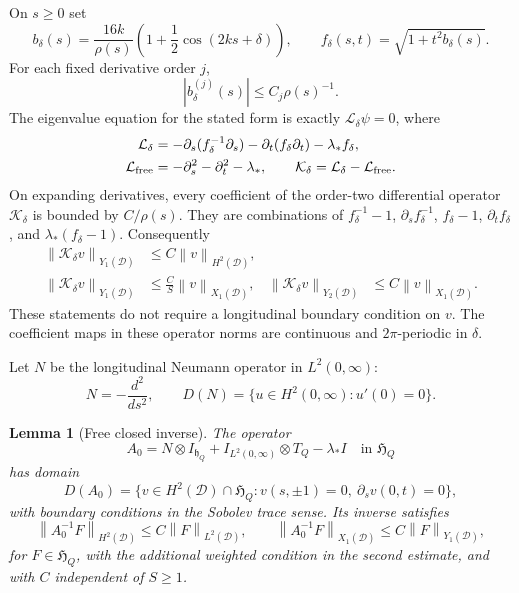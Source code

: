\documentclass[11pt,a4paper]{article}
\newtheorem{lemma}{Lemma}
\newcommand{\D}{\mathcal D}
\newcommand{\Lop}{\mathcal L}
\newcommand{\Kop}{\mathcal K}
\newcommand{\norm}[1]{\left\lVert#1\right\rVert}
\begin{document}
On $s\ge0$ set
\begin{equation}\label{eq:b}
 b_\delta(s)=\frac{16k}{\rho(s)}
       \left(1+\frac12\cos(2ks+\delta)\right),\qquad
 f_\delta(s,t)=\sqrt{1+t^2b_\delta(s)}.
\end{equation}
For each fixed derivative order $j$,
\begin{equation}\label{eq:b-bound}
 |b_\delta^{(j)}(s)|\le C_j\rho(s)^{-1}.
\end{equation}
The eigenvalue equation for the stated form is exactly $\Lop_\delta\psi=0$, where
\begin{align}
 \Lop_\delta
 &=-\partial_s(f_\delta^{-1}\partial_s)
   -\partial_t(f_\delta\partial_t)-\lambda_*f_\delta,
 \label{eq:L}\\
 \Lop_{\rm free}&=-\partial_s^2-\partial_t^2-\lambda_*,
 \qquad \Kop_\delta=\Lop_\delta-\Lop_{\rm free}.\notag
\end{align}
On expanding derivatives, every coefficient of the order-two differential
operator $\Kop_\delta$ is bounded by $C/\rho(s)$. They are combinations of
$f_\delta^{-1}-1$, $\partial_sf_\delta^{-1}$, $f_\delta-1$,
$\partial_tf_\delta$, and $\lambda_*(f_\delta-1)$. Consequently
\begin{align}
 \norm{\Kop_\delta v}_{Y_1(\D)}&\le C\norm{v}_{H^2(\D)},\label{eq:K1}\\
 \norm{\Kop_\delta v}_{Y_1(\D)}&\le \frac CS\norm{v}_{X_1(\D)},
 &\norm{\Kop_\delta v}_{Y_2(\D)}&\le C\norm{v}_{X_1(\D)}.
 \label{eq:K2}
\end{align}
These statements do not require a longitudinal boundary condition on $v$.
The coefficient maps in these operator norms are continuous and
$2\pi$-periodic in $\delta$.

Let $N$ be the longitudinal Neumann operator in $L^2(0,\infty)$:
\[
 N=-\frac{d^2}{ds^2},\qquad
 D(N)=\{u\in H^2(0,\infty):u'(0)=0\}.
\]

\begin{lemma}[Free closed inverse]\label{lem:closed-free}
The operator
\[
 A_0=N\otimes I_{\mathfrak h_Q}
       +I_{L^2(0,\infty)}\otimes T_Q-\lambda_*I
 \quad\text{in }\mathfrak H_Q
\]
has domain
\[
 D(A_0)=\{v\in H^2(\D)\cap\mathfrak H_Q:
          v(s,\pm1)=0,\ \partial_sv(0,t)=0\},
\]
with boundary conditions in the Sobolev trace sense. Its inverse satisfies
\[
 \norm{A_0^{-1}F}_{H^2(\D)}\le C\norm{F}_{L^2(\D)},\qquad
 \norm{A_0^{-1}F}_{X_1(\D)}\le C\norm{F}_{Y_1(\D)},
\]
for $F\in\mathfrak H_Q$, with the additional weighted condition in the
second estimate, and with $C$ independent of $S\ge1$.
\end{lemma}
\end{document}
